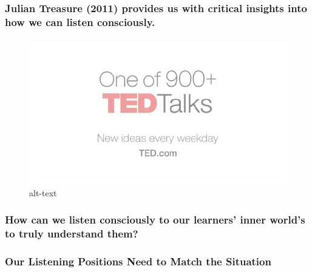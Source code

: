 \documentclass[
]{book}
\begin{document}
\hypertarget{julian-treasure-2011-provides-us-with-critical-insights-into-how-we-can-listen-consciously.}{%
\subsubsection*{Julian Treasure (2011) provides us with critical insights into how we can listen consciously.}\label{julian-treasure-2011-provides-us-with-critical-insights-into-how-we-can-listen-consciously.}}

\begin{figure}
\centering
\includegraphics{assets/presentations/coaching/ted.jpg}
\caption{alt-text}
\end{figure}

\hypertarget{how-can-we-listen-consciously-to-our-learners-inner-worlds-to-truly-understand-them}{%
\subsubsection*{How can we listen consciously to our learners' inner world's to truly understand them?}\label{how-can-we-listen-consciously-to-our-learners-inner-worlds-to-truly-understand-them}}

\hypertarget{our-listening-positions-need-to-match-the-situation}{%
\subsubsection*{Our Listening Positions Need to Match the Situation}\label{our-listening-positions-need-to-match-the-situation}}
\end{document}
